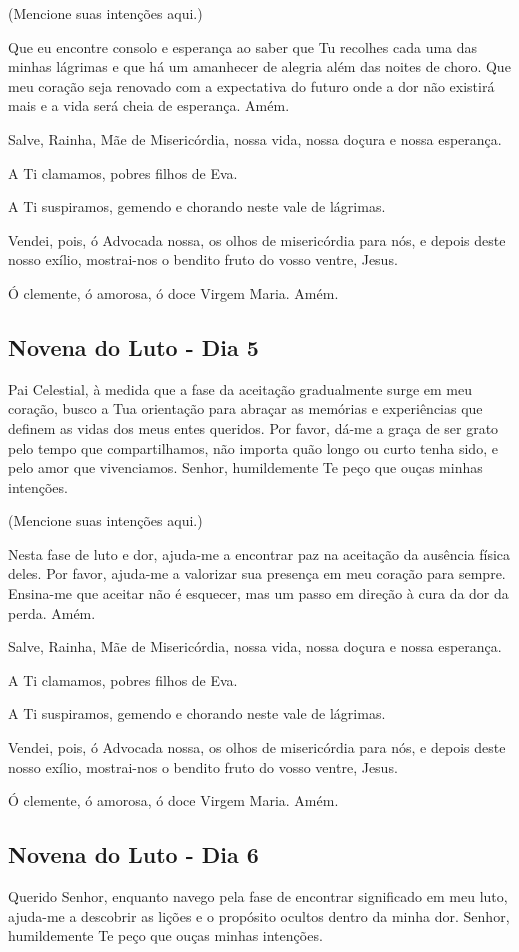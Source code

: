 \documentclass[18pt]{article}
\begin{document}
(Mencione suas intenções aqui.)

Que eu encontre consolo e esperança ao saber que Tu recolhes cada uma das minhas lágrimas e que há um amanhecer de alegria além das noites de choro. Que meu coração seja renovado com a expectativa do futuro onde a dor não existirá mais e a vida será cheia de esperança. Amém.

Salve, Rainha, Mãe de Misericórdia, nossa vida, nossa doçura e nossa esperança.

A Ti clamamos, pobres filhos de Eva.

A Ti suspiramos, gemendo e chorando neste vale de lágrimas.

Vendei, pois, ó Advocada nossa, os olhos de misericórdia para nós, e depois deste nosso exílio, mostrai-nos o bendito fruto do vosso ventre, Jesus.

Ó clemente, ó amorosa, ó doce Virgem Maria. Amém.

\subsection{Novena do Luto - Dia 5}
Pai Celestial, à medida que a fase da aceitação gradualmente surge em meu coração, busco a Tua orientação para abraçar as memórias e experiências que definem as vidas dos meus entes queridos. Por favor, dá-me a graça de ser grato pelo tempo que compartilhamos, não importa quão longo ou curto tenha sido, e pelo amor que vivenciamos. Senhor, humildemente Te peço que ouças minhas intenções.

(Mencione suas intenções aqui.)

Nesta fase de luto e dor, ajuda-me a encontrar paz na aceitação da ausência física deles. Por favor, ajuda-me a valorizar sua presença em meu coração para sempre. Ensina-me que aceitar não é esquecer, mas um passo em direção à cura da dor da perda. Amém.

Salve, Rainha, Mãe de Misericórdia, nossa vida, nossa doçura e nossa esperança.

A Ti clamamos, pobres filhos de Eva.

A Ti suspiramos, gemendo e chorando neste vale de lágrimas.

Vendei, pois, ó Advocada nossa, os olhos de misericórdia para nós, e depois deste nosso exílio, mostrai-nos o bendito fruto do vosso ventre, Jesus.

Ó clemente, ó amorosa, ó doce Virgem Maria. Amém.

\subsection{Novena do Luto - Dia 6}
Querido Senhor, enquanto navego pela fase de encontrar significado em meu luto, ajuda-me a descobrir as lições e o propósito ocultos dentro da minha dor. Senhor, humildemente Te peço que ouças minhas intenções.
\end{document}
